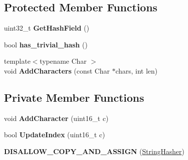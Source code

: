 \subsection*{Protected Member Functions}
\begin{DoxyCompactItemize}
\item 
uint32\+\_\+t {\bfseries Get\+Hash\+Field} ()\hypertarget{classv8_1_1internal_1_1_string_hasher_a24cb87423be59db3fe160354f68d7a96}{}\label{classv8_1_1internal_1_1_string_hasher_a24cb87423be59db3fe160354f68d7a96}

\item 
bool {\bfseries has\+\_\+trivial\+\_\+hash} ()\hypertarget{classv8_1_1internal_1_1_string_hasher_ae1dc7e4c63246108c06add8f976a3972}{}\label{classv8_1_1internal_1_1_string_hasher_ae1dc7e4c63246108c06add8f976a3972}

\item 
{\footnotesize template$<$typename Char $>$ }\\void {\bfseries Add\+Characters} (const Char $\ast$chars, int len)\hypertarget{classv8_1_1internal_1_1_string_hasher_a77e937ce030d8be14c67cbf03f5b6980}{}\label{classv8_1_1internal_1_1_string_hasher_a77e937ce030d8be14c67cbf03f5b6980}

\end{DoxyCompactItemize}
\subsection*{Private Member Functions}
\begin{DoxyCompactItemize}
\item 
void {\bfseries Add\+Character} (uint16\+\_\+t c)\hypertarget{classv8_1_1internal_1_1_string_hasher_a1e2fab282171314dcf5757b32f6ea78e}{}\label{classv8_1_1internal_1_1_string_hasher_a1e2fab282171314dcf5757b32f6ea78e}

\item 
bool {\bfseries Update\+Index} (uint16\+\_\+t c)\hypertarget{classv8_1_1internal_1_1_string_hasher_aaaa42278be841c1fac92b0a64b4ff642}{}\label{classv8_1_1internal_1_1_string_hasher_aaaa42278be841c1fac92b0a64b4ff642}

\item 
{\bfseries D\+I\+S\+A\+L\+L\+O\+W\+\_\+\+C\+O\+P\+Y\+\_\+\+A\+N\+D\+\_\+\+A\+S\+S\+I\+GN} (\hyperlink{classv8_1_1internal_1_1_string_hasher}{String\+Hasher})\hypertarget{classv8_1_1internal_1_1_string_hasher_aa3dcb0c04080b514d0e2a89a54fa1bae}{}\label{classv8_1_1internal_1_1_string_hasher_aa3dcb0c04080b514d0e2a89a54fa1bae}

\end{DoxyCompactItemize}
